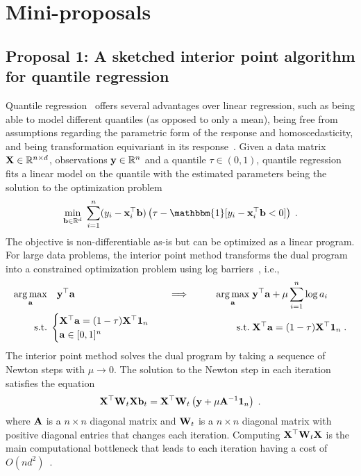

\section{Mini-proposals}

\subsection[A sketched interior point algorithm for quantile regression]{Proposal 1: A sketched interior point algorithm for quantile regression} %

Quantile regression~\citep{Koenker:1978} offers several advantages over linear regression, such as being able to model different quantiles (as opposed to only a mean), being free from assumptions regarding the parametric form of the response and homoscedasticity, and being transformation equivariant in its response~\citep{Rodriguez:2017}. Given a data matrix $\mathbf{X}\in\mathbb{R}^{n\times d}$, observations $\mathbf{y}\in\mathbb{R}^{n}$ and a quantile $\tau\in(0,1)$, quantile regression fits a linear model on the quantile with the estimated parameters being the solution to the optimization problem
\[
\min_{\bfb\in\bbR^d} \; \sum_{i=1}^n(y_i-\bfx_i^\T\bfb)\left(\tau - \mathbbm{1}[y_i-\bfx_i^\top\bfb < 0]\right) \;.
\]
The objective is non-differentiable as-is but can be optimized as a linear program. For large data problems, the interior point method transforms the dual program into a constrained optimization problem using log barriers~\citep{Portnoy:1997}, i.e.,
\begin{align*}
\operatorname*{arg\,max}_{\mathbf{a}}&\quad \mathbf{y}^\top\mathbf{a} & &\Longrightarrow\qquad & 
\operatorname*{arg\,max}_{\mathbf{a}}&\; \mathbf{y}^\top\mathbf{a}+\mu\sum_{i=1}^n\log a_i \\
\text{s.t.}&\;\begin{cases}
\mathbf{X}^\top\mathbf{a}=(1-\tau)\mathbf{X}^\top\mathbf{1}_n \\ \mathbf{a}\in[0,1]^n 
\end{cases} &&& \text{s.t.}&\; \mathbf{X}^\top\mathbf{a}=(1-\tau)\mathbf{X}^\top\mathbf{1}_n \;.
\end{align*}
The interior point method solves the dual program by taking a sequence of Newton steps with $\mu\rightarrow0$. The solution to the Newton step in each iteration satisfies the equation
\[
\mathbf{X}^\top\mathbf{W}_t\mathbf{X}\mathbf{b}_t = \mathbf{X}^\top\mathbf{W}_t\left(\mathbf{y}+\mu\mathbf{A}^{-1}\mathbf{1}_n\right) \;.
\]
where $\mathbf{A}$ is a $n\times n$ diagonal matrix and $\mathbf{W}_t$ is a $n\times n$ diagonal matrix with positive diagonal entries that changes each iteration. Computing $\mathbf{X}^\top\mathbf{W}_t\mathbf{X}$ is the main computational bottleneck that leads to each iteration having a cost of $O(nd^2)$~\citep{Chen:2005}.
\\

